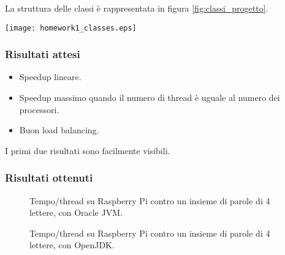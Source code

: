 \documentclass[]{myarticle}
\begin{document}
La struttura delle classi \`e rappresentata in figura \ref{fig:classi_progetto}.

\begin{figure*}[th]
	\centering
	\texttt{[image: homework1\_classes.eps]}
	\caption{Struttura delle classi del progetto.}
	\label{fig:classi_progetto}
\end{figure*}

\subsubsection{Risultati attesi}

\begin{itemize}
	\item Speedup lineare.
	\item Speedup massimo quando il numero di thread \`e uguale al numero dei processori.
	\item Buon load balancing.
\end{itemize}
I primi due risultati sono facilmente visibili.

\subsubsection{Risultati ottenuti}



\begin{figure}[hp]
	\caption{Tempo/thread su Raspberry Pi contro un insieme di parole di 4 lettere, con Oracle JVM.}
\end{figure}

\begin{figure}[hp]
	\caption{Tempo/thread su Raspberry Pi contro un insieme di parole di 4 lettere, con OpenJDK.}
\end{figure}
\end{document}
